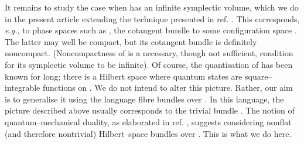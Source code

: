 \documentclass[a4paper,a4paper]{article}
\begin{document}
It remains to study the case when \coordHE{} has an infinite symplectic volume,
which we do in the present article extending the technique presented in ref. \cite{PQM}.
This corresponds, {\it e.g.}, to phase spaces such as \coordHE{}, the cotangent 
bundle to some configuration space \coordHE{}. The latter may well be compact, but its 
cotangent bundle is definitely noncompact. (Noncompactness of \coordHE{} is a necessary, 
though not sufficient, condition for its symplectic volume to be infinite). 
Of course, the quantisation of \coordHE{} has been known for long; there is a 
Hilbert space \coordHE{} where quantum states are square--integrable functions 
on \coordHE{}. We do not intend to alter this picture. Rather, our aim is 
to generalise it using the language fibre bundles over \coordHE{} 
\cite{REUTER}. In this 
language, the picture described above usually corresponds to the trivial bundle 
\coordHE{}. The notion of quantum--mechanical duality, as elaborated 
in ref. \cite{PQM}, suggests considering nonflat (and therefore nontrivial) Hilbert--space 
bundles over \coordHE{}. This is what we do here.
\end{document}
